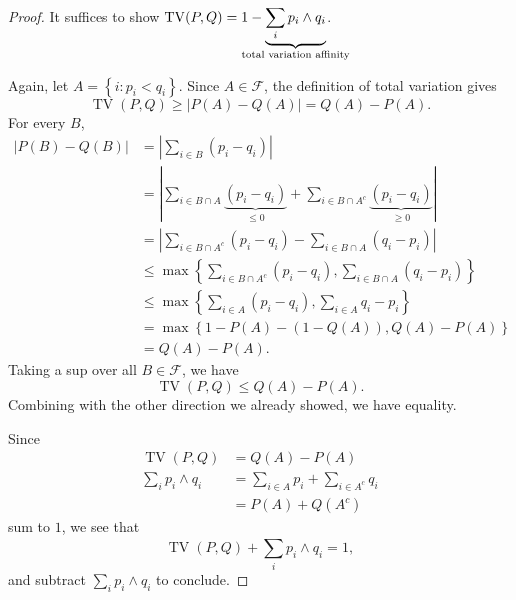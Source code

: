 \begin{proof}
	It suffices to show $\operatorname{TV}(P,Q) = 1- \underbrace{\sum_{i}^{} p_i \wedge q_i}_{\mathclap{\text{total variation affinity}}}$.

	Again, let $A = \left\{i: p_i < q_i\right\}$. Since $A \in \mathscr{F}$, the definition of total variation gives \[
		\operatorname{TV}(P,Q) \ge \left|P(A) - Q(A)\right| = Q(A) - P(A)
	.\] For every $B$, 
	\begin{align*}
		\left| P(B) - Q(B) \right|
		&= \left|\sum\limits_{i\in B}^{} (p_i - q_i) \right| \\
		&= \left| \sum\limits_{i \in B \cap A}^{} \underbrace{(p_i - q_i)}_{\le 0} + \sum\limits_{i \in B\cap A^{c}}^{} \underbrace{(p_i - q_i)}_{\ge 0}\right| \\
		&= \left| \sum\limits_{i \in B \cap A^{c}}^{} (p_i - q_i) - \sum\limits_{i\in B \cap A}^{} (q_i - p_i) \right|\\
		&\le \max \left\{\sum\limits_{i \in B \cap A^{c}}^{} (p_i - q_i) , \sum\limits_{i \in B \cap A}^{} (q_i - p_i)\right\} \\
		&\le \max \left\{\sum\limits_{i\in A}^{} (p_i - q_i), \sum\limits_{i \in A}^{} q_i - p_i\right\} \\
		&= \max \left\{1-P(A) - (1- Q(A)), Q(A) - P(A)\right\} \\
		&= Q(A) - P(A)
	.\end{align*}
	Taking a sup over all $B \in \mathscr{F}$, we have \[
		\operatorname{TV}(P,Q) \le Q(A) - P(A)
	.\] Combining with the other direction we already showed, we have equality.

	Since 
	\begin{align*}
		\operatorname{TV}(P,Q) &= Q(A) - P(A) \\
		\sum\limits_{i}^{} p_i \wedge q_i &= \sum\limits_{i \in A}^{} p_i + \sum\limits_{i \in A^{c}}^{} q_i \\
										  &= P(A) + Q(A^{c})
	\end{align*}
	sum to $1$, we see that \[
		\operatorname{TV}(P,Q) + \sum\limits_{i}^{} p_i \wedge q_i = 1
	,\] and subtract $\sum_{i}^{} p_i \wedge q_i$ to conclude.
\end{proof}

